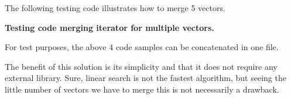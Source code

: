 The following testing code illustrates how to merge 5 vectors.

\textbf{Testing code merging iterator for multiple vectors.}

\begin{Shaded}
\begin{Highlighting}[]
\AttributeTok{#[}\AttributeTok{]}
 
     \NormalTok{<}\NormalTok{<_>> = }\NormalTok{[}
        \NormalTok{[}\NormalTok{, }\NormalTok{, }\NormalTok{, }\NormalTok{, }\NormalTok{],}
        \NormalTok{[}\NormalTok{, }\NormalTok{, }\NormalTok{, }\NormalTok{],}
        \NormalTok{[}\NormalTok{, }\NormalTok{, }\NormalTok{],}
        \NormalTok{[}\NormalTok{, }\NormalTok{, }\NormalTok{],}
        \NormalTok{[}\NormalTok{]}
    \NormalTok{];}

     \NormalTok{<_> = }\NormalTok{<_>>();}

     \NormalTok{[}\NormalTok{, }\NormalTok{, }\NormalTok{, }\NormalTok{, }\NormalTok{, }\NormalTok{, }\NormalTok{, }\NormalTok{, }\NormalTok{, }\NormalTok{, }\NormalTok{, }\NormalTok{, }\NormalTok{, }\NormalTok{, }\NormalTok{, }\NormalTok{];}
     \NormalTok{)}
    \NormalTok{);}
\NormalTok{\}}
\end{Highlighting}
\end{Shaded}

For test purposes, the above 4 code samples can be concatenated in one
file.

The benefit of this solution is its simplicity and that it does not
require any external library. Sure, linear search is not the fastest
algorithm, but seeing the little number of vectors we have to merge this
is not necessarily a drawback.

